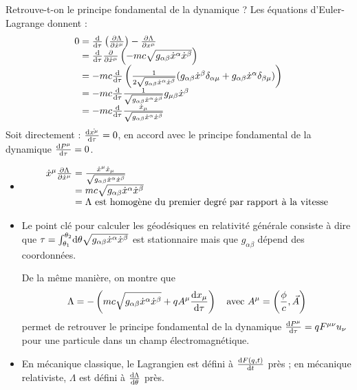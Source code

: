 Retrouve-t-on le principe fondamental de la dynamique ? Les équations d'Euler-Lagrange donnent :
$$
	\begin{array}{r@{\;}l}
		0&=\frac{\dif}{\dif \tau}\left(\frac{\partial\Lambda}{\partial\dot{x}^\mu}\right)-\frac{\partial\Lambda}{\partial x^\mu}\\
			&=\frac{\dif}{\dif\tau}\frac{\partial}{\partial\dot{x}^\mu}\left(-mc\sqrt{g_{\alpha\beta}\dot{x}^{\alpha}\dot{x}^{\beta}}\right)\\
			&=-mc\frac{\dif}{\dif\tau}\left(\frac{1}{2\sqrt{g_{\alpha\beta}\dot{x}^{\alpha}\dot{x}^{\beta}}}( g_{\alpha\beta}\dot{x}^{\beta}\delta_{\alpha\mu}+g_{\alpha\beta}\dot{x}^{\alpha}\delta_{\beta\mu})\right)\\
			&=-mc\frac{\dif}{\dif\tau}\frac{1}{\sqrt{g_{\alpha\beta}\dot{x}^{\alpha}\dot{x}^{\beta}}}g_{\mu\beta}\dot{x}^{\beta}\\
			&=-mc\frac{\dif}{\dif\tau}\frac{\dot{x}_\mu}{\sqrt{g_{\alpha\beta}\dot{x}^{\alpha}\dot{x}^{\beta}}}
	\end{array}
$$
Soit directement : $\frac{\mathrm{d}\dot{x^\mu}}{\mathrm{d}\tau}=0$, en accord avec le principe fondamental de la dynamique $\frac{\mathrm{d} P^\mu}{\mathrm{d}\tau}=0$.

\begin{remarks}\hspace*{1pt}
	\begin{itemize}
		\item 
		$$
			\begin{array}{r@{\;}l}
				\dot{x}^\mu\frac{\partial\Lambda}{\partial\dot{x}^\mu}&=\frac{\dot{x}^\mu\dot{x}_\mu}{\sqrt{g_{\alpha\beta}\dot{x}^{\alpha}\dot{x}^{\beta}}}\\
					&=mc\sqrt{g_{\alpha\beta}\dot{x}^{\alpha}\dot{x}^{\beta}}\\
					&=\Lambda \text{ est homogène du premier degré par rapport à la vitesse}
			\end{array}
		$$
		\item {\txt Le point clé pour calculer les géodésiques en relativité générale consiste à dire que $\tau=\int_{\theta_1}^{\theta_2}\!\mathrm{d}\theta\sqrt{g_{\alpha\beta}\dot{x}^{\alpha}\dot{x}^{\beta}}$ est stationnaire mais que $g_{\alpha\beta}$ dépend des coordonnées.} 
		\begin{exo}
			{\txt De la m\^eme manière, on montre que
			$$
				\Lambda=-\left(mc\sqrt{g_{\alpha\beta}\dot{x}^{\alpha}\dot{x}^{\beta}}+qA^\mu\frac{\mathrm{d} x_\mu}{\mathrm{d}\tau}\right)\text{\hspace{10pt}avec }A^\mu=\left(\frac{\phi}{c},\vec{A}\right)
			$$
			permet de retrouver le principe fondamental de la dynamique $\frac{\mathrm{d} P^\mu}{\mathrm{d}\tau}=qF^{\mu\nu}u_\nu$ pour une particule dans un champ électromagnétique.}
		\end{exo}
		\item {\txt En mécanique classique, le Lagrangien est défini à $\frac{\mathrm{d} F(q,t)}{\mathrm{d} t}$ près ; en mécanique relativiste, $\Lambda$ est défini à $\frac{\mathrm{d}\Lambda}{\mathrm{d}\theta}$ près.}
	\end{itemize}
\end{remarks}

